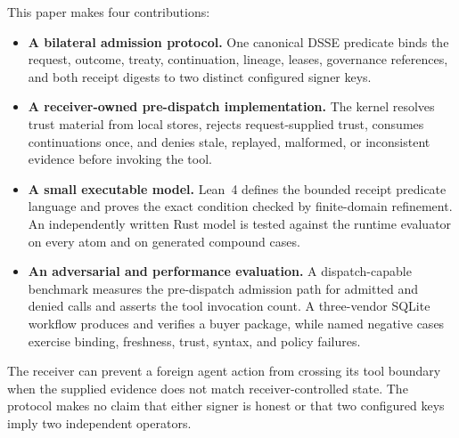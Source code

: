This paper makes four contributions:

\begin{itemize}[noitemsep,topsep=2pt,leftmargin=1.2em]
  \item \textbf{A bilateral admission protocol.} One canonical DSSE predicate
  binds the request, outcome, treaty, continuation, lineage, leases,
  governance references, and both receipt digests to two distinct configured
  signer keys.
  \item \textbf{A receiver-owned pre-dispatch implementation.} The kernel
  resolves trust material from local stores, rejects request-supplied trust,
  consumes continuations once, and denies stale, replayed, malformed, or
  inconsistent evidence before invoking the tool.
  \item \textbf{A small executable model.} Lean~4 defines the bounded receipt
  predicate language and proves the exact condition checked by finite-domain
  refinement. An independently written Rust model is tested against the
  runtime evaluator on every atom and on generated compound cases.
  \item \textbf{An adversarial and performance evaluation.} A dispatch-capable
  benchmark measures the pre-dispatch admission path for admitted and denied
  calls and asserts the tool invocation count. A three-vendor SQLite workflow
  produces and verifies a buyer package, while \PSThreatCaseCount{} named
  negative cases exercise binding, freshness, trust, syntax, and policy
  failures.
\end{itemize}

The receiver can prevent a foreign agent action from crossing its tool boundary
when the supplied evidence does not match receiver-controlled state. The
protocol makes no claim that either signer is honest or that two configured
keys imply two independent operators.
